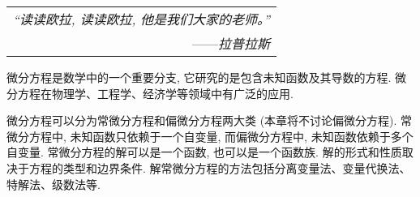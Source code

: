 \begin{flushright}
    \begin{tabular}{r|}
        \textit{“读读欧拉, 读读欧拉, 他是我们大家的老师。”}\\
        ——\textit{拉普拉斯}
    \end{tabular}
\end{flushright}

微分方程是数学中的一个重要分支, 它研究的是包含未知函数及其导数的方程. 微分方程在物理学、工程学、经济学等领域中有广泛的应用. 

微分方程可以分为常微分方程和偏微分方程两大类 (本章将不讨论偏微分方程). 常微分方程中, 未知函数只依赖于一个自变量, 而偏微分方程中, 未知函数依赖于多个自变量. 
常微分方程的解可以是一个函数, 也可以是一个函数族. 解的形式和性质取决于方程的类型和边界条件. 解常微分方程的方法包括分离变量法、变量代换法、特解法、级数法等. 